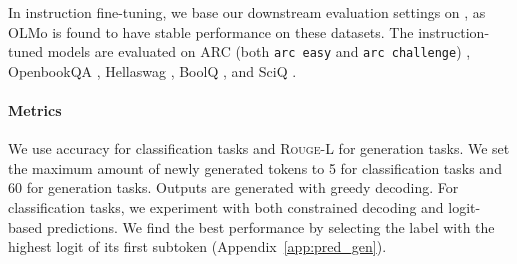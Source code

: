 In instruction fine-tuning, we base our downstream evaluation settings on \citealp{groeneveld2024olmo}, as OLMo is found to have stable performance on these datasets.
The instruction-tuned models are evaluated on ARC (both \texttt{arc easy} and \texttt{arc challenge}) \cite{clark2018think}, OpenbookQA \cite{mihaylov-etal-2018-suit}, Hellaswag \cite{zellers-etal-2019-hellaswag}, BoolQ \cite{clark-etal-2019-boolq}, and SciQ \cite{welbl2017crowdsourcing}. 


\paragraph{Metrics}
We use accuracy \cite{scikit-learn} for classification tasks and \textsc{Rouge-L} \cite{lin-2004-rouge} for generation tasks.
We set the maximum amount of newly generated tokens to 5 for classification tasks and 60 for generation tasks.
Outputs are generated with greedy decoding.
For classification tasks, we experiment with both constrained decoding and logit-based predictions.
We find the best performance by selecting the label with the highest logit of its first subtoken (Appendix~\ref{app:pred_gen}).


